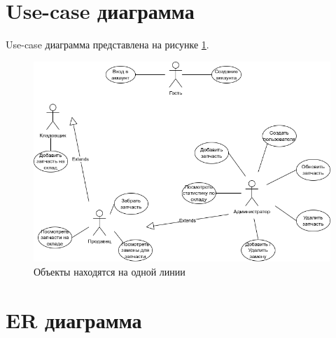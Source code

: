 \section{Use-case диаграмма}
Use-case диаграмма представлена на рисунке \ref{img:usecase-diagram}.
\begin{center}
	\begin{figure}[H]
		\centering
		\includegraphics[scale=0.5]{inc/img/use-case.png}
		\caption{Объекты находятся на одной линии}
		\label{img:usecase-diagram}
	\end{figure}
\end{center}

\section{ER диаграмма}

